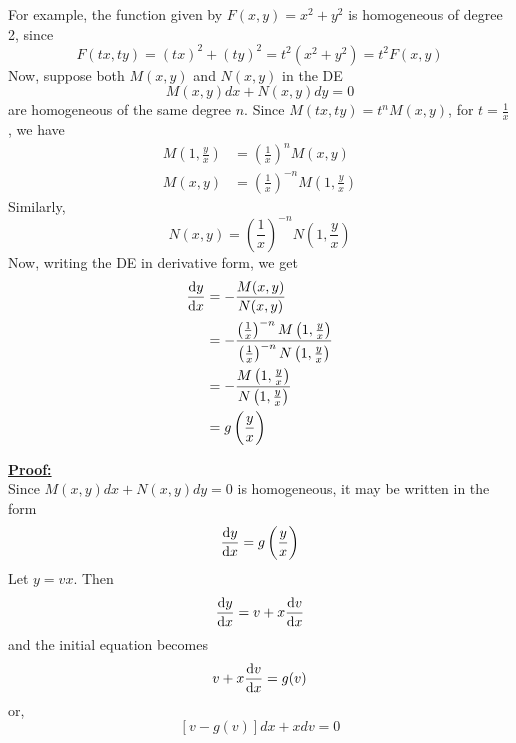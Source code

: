 For example, the function given by $F(x,y) = x^2+y^2$ is homogeneous of degree 2, since \[
    F(tx,ty) = (tx)^2+(ty)^2 = t^2(x^2+y^2) = t^2F(x,y)
\]
Now, suppose both $M(x,y)$ and $N(x,y)$ in the DE \[
    M(x,y) d{x} + N(x,y) d{y} = 0
\] are homogeneous of the same degree $n$. Since $M(tx,ty) = t^n M(x,y)$, for $t = \frac{1}{x}$, we have
\begin{align*}
    M \left( 1,\frac{y}{x} \right) &= \left( \frac{1}{x} \right)^n M(x,y) \\
    M(x,y) &= \left( \frac{1}{x} \right)^{-n} M\left( 1, \frac{y}{x} \right)
\end{align*}
Similarly, \[
    N(x,y) = \left( \frac{1}{x} \right)^{-n} N\left( 1, \frac{y}{x} \right)
\]
Now, writing the DE in derivative form, we get
\begin{align*}
    \dv{y}{x} &= - \frac{M(x,y)}{N(x,y)} \\
    &= - \frac{ \left(\frac{1}{x}\right)^{-n} M\left(1,\frac{y}{x}\right) }{ \left(\frac{1}{x}\right)^{-n} N\left(1,\frac{y}{x}\right) } \\
    &= - \frac{M\left(1,\frac{y}{x}\right)}{N\left(1,\frac{y}{x}\right)} \\
    &= g\left(\frac{y}{x}\right)
\end{align*}


 \vspace{0.5cm}

\underline{\textbf{Proof:}} \\
Since $M(x,y) d{x} + N(x,y) d{y} = 0$ is homogeneous, it may be written in the form \[
    \dv{y}{x} = g \left( \frac{y}{x} \right)
\] Let $y = vx$. Then \[
    \dv{y}{x} = v + x\dv{v}{x}
\] and the initial equation becomes \[
    v + x\dv{v}{x} = g(v)
\] or, \[
    [v - g(v)] d{x} + x d{v} = 0
\]

